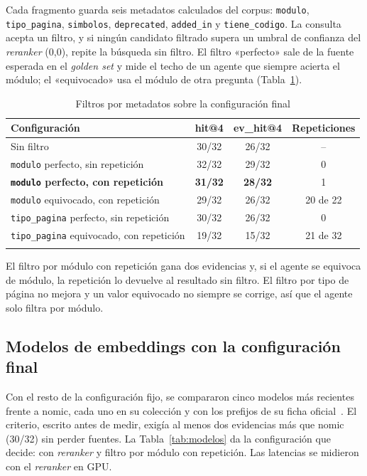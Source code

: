 \documentclass[pdflatex,sn-mathphys-num]{sn-jnl}
\begin{document}
Cada fragmento guarda seis metadatos calculados del corpus: \texttt{modulo}, \texttt{tipo\_pagina}, \texttt{simbolos}, \texttt{deprecated}, \texttt{added\_in} y \texttt{tiene\_codigo}. La consulta acepta un filtro, y si ningún candidato filtrado supera un umbral de confianza del \emph{reranker} (0,0), repite la búsqueda sin filtro. El filtro «perfecto» sale de la fuente esperada en el \emph{golden set} y mide el techo de un agente que siempre acierta el módulo; el «equivocado» usa el módulo de otra pregunta (Tabla~\ref{tab:metadatos}).

\begin{table}[h]
\caption{Filtros por metadatos sobre la configuración final}\label{tab:metadatos}
\begin{tabular}{@{}lccc@{}}
\toprule
Configuración & hit@4 & ev\_hit@4 & Repeticiones \\
\midrule
Sin filtro & 30/32 & 26/32 & -- \\
\texttt{modulo} perfecto, sin repetición & 32/32 & 29/32 & 0 \\
\textbf{\texttt{modulo} perfecto, con repetición} & \textbf{31/32} & \textbf{28/32} & 1 \\
\texttt{modulo} equivocado, con repetición & 29/32 & 26/32 & 20 de 22 \\
\texttt{tipo\_pagina} perfecto, sin repetición & 30/32 & 26/32 & 0 \\
\texttt{tipo\_pagina} equivocado, con repetición & 19/32 & 15/32 & 21 de 32 \\
\botrule
\end{tabular}
\end{table}

El filtro por módulo con repetición gana dos evidencias y, si el agente se equivoca de módulo, la repetición lo devuelve al resultado sin filtro. El filtro por tipo de página no mejora y un valor equivocado no siempre se corrige, así que el agente solo filtra por módulo.

\subsection{Modelos de embeddings con la configuración final}\label{sec:res-modelos}

Con el resto de la configuración fijo, se compararon cinco modelos más recientes frente a nomic, cada uno en su colección y con los prefijos de su ficha oficial~\cite{qwen3emb,bgem3,embeddinggemma,jinacode}. El criterio, escrito antes de medir, exigía al menos dos evidencias más que nomic (30/32) sin perder fuentes. La Tabla~\ref{tab:modelos} da la configuración que decide: con \emph{reranker} y filtro por módulo con repetición. Las latencias se midieron con el \emph{reranker} en GPU.
\end{document}
